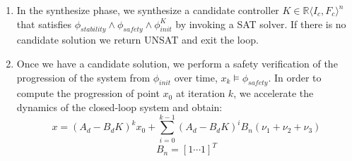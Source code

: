 \documentclass[twocolumn]{autart}    %
\newcommand{\mat}[1]{\boldsymbol{#1}}
\begin{document}
\begin{enumerate}
\begin{enumerate}
\end{enumerate}
\item In the {\sc synthesize} phase, we synthesize a candidate controller
  $K \in \mathbb{R}\langle I_c,F_c\rangle^n$ that satisfies
  $\phi_\mathit{stability} \wedge \phi_\mathit{safety} \wedge \phi_\mathit{init}^{K}$ by invoking a SAT solver.
If there is no candidate solution we return UNSAT and exit the loop.
\item Once we have a candidate solution, we perform a safety verification %
  of the 
  progression of the system from $\phi_\mathit{init}$ over time,
$x_{k} \models \phi_\mathit{safety}$. %
  In order to compute the progression of point $x_0$ at iteration $k$,
  we accelerate the dynamics of the closed-loop system and obtain:
%
{
\scriptsize
\begin{equation}
x=(A_d-B_dK)^kx_0+ \sum_{i=0}^{k-1} (A_d-B_dK)^i B_{n}(\nu_1+\nu_2+\nu_3)%
\end{equation}
\begin{equation}
B_n= [1 \cdots 1]^T
\end{equation}
}


\end{enumerate}
\end{document}
